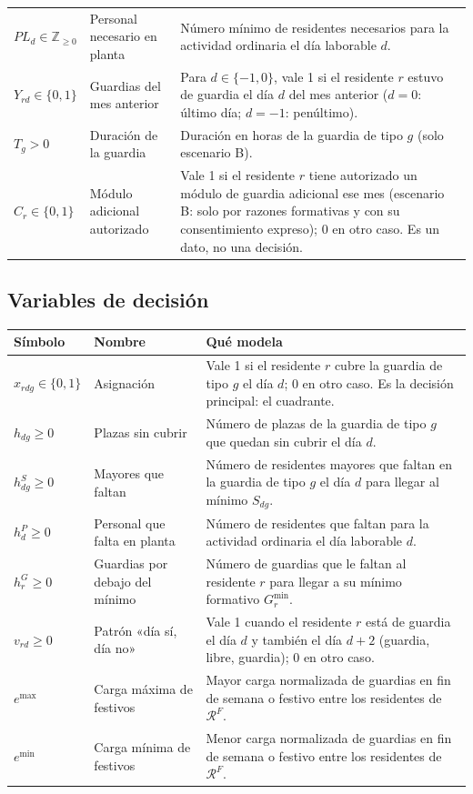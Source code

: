 {\begin{longtable}{@{}p{2.6cm}p{3.0cm}p{10.0cm}@{}}
$PL_d \in \mathbb{Z}_{\ge 0}$ & Personal necesario en planta & Número mínimo de residentes necesarios para la actividad ordinaria el día laborable $d$. \\
$Y_{rd} \in \{0, 1\}$ & Guardias del mes anterior & Para $d \in \{-1, 0\}$, vale 1 si el residente $r$ estuvo de guardia el día $d$ del mes anterior ($d = 0$: último día; $d = -1$: penúltimo). \\
$T_g > 0$ & Duración de la guardia & Duración en horas de la guardia de tipo $g$ (solo escenario B). \\
$C_r \in \{0, 1\}$ & Módulo adicional autorizado & Vale 1 si el residente $r$ tiene autorizado un módulo de guardia adicional ese mes (escenario B: solo por razones formativas y con su consentimiento expreso); 0 en otro caso. Es un dato, no una decisión. \\
\bottomrule
\end{longtable}\addtocounter{table}{-1}%
}

\subsection{Variables de decisión}

{\small
\begin{longtable}{@{}p{2.6cm}p{3.0cm}p{10.0cm}@{}}
\toprule
Símbolo & Nombre & Qué modela \\
\midrule
\endhead
$x_{rdg} \in \{0, 1\}$ & Asignación & Vale 1 si el residente $r$ cubre la guardia de tipo $g$ el día $d$; 0 en otro caso. Es la decisión principal: el cuadrante. \\
$h_{dg} \ge 0$ & Plazas sin cubrir & Número de plazas de la guardia de tipo $g$ que quedan sin cubrir el día $d$. \\
$h^{S}_{dg} \ge 0$ & Mayores que faltan & Número de residentes mayores que faltan en la guardia de tipo $g$ el día $d$ para llegar al mínimo $S_{dg}$. \\
$h^{P}_{d} \ge 0$ & Personal que falta en planta & Número de residentes que faltan para la actividad ordinaria el día laborable $d$. \\
$h^{G}_{r} \ge 0$ & Guardias por debajo del mínimo & Número de guardias que le faltan al residente $r$ para llegar a su mínimo formativo $G^{\min}_r$. \\
$v_{rd} \ge 0$ & Patrón «día sí, día no» & Vale 1 cuando el residente $r$ está de guardia el día $d$ y también el día $d+2$ (guardia, libre, guardia); 0 en otro caso. \\
$e^{\max}$ & Carga máxima de festivos & Mayor carga normalizada de guardias en fin de semana o festivo entre los residentes de $\mathcal{R}^F$. \\
$e^{\min}$ & Carga mínima de festivos & Menor carga normalizada de guardias en fin de semana o festivo entre los residentes de $\mathcal{R}^F$. \\
\bottomrule
\end{longtable}\addtocounter{table}{-1}%
}

